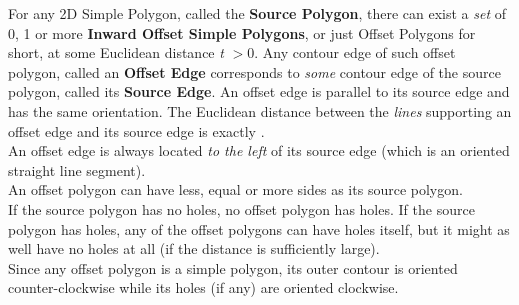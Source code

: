 For any 2D Simple Polygon, called the \textbf{Source Polygon}, there can exist a \textit{set} of 0, 1 or more \textbf{Inward Offset Simple Polygons}, or just Offset Polygons for short, at some Euclidean distance \textit{t} $>0$. Any contour edge of such offset polygon, called an \textbf{Offset Edge} corresponds to \textit{some} contour edge of the source polygon, called its \textbf{Source Edge}. An offset edge is parallel to its source edge and has the same orientation. The Euclidean distance between the \textit{lines} supporting an offset edge and its source edge is exactly .\\
An offset edge is always located \textit{to the left} of its source edge (which is an oriented straight line segment).\\
An offset polygon can have less, equal or more sides as its source polygon.\\
If the source polygon has no holes, no offset polygon has holes. If the source polygon has holes, any of the offset polygons can have holes itself, but it might as well have no holes at all (if the distance is sufficiently large).\\
Since any offset polygon is a simple polygon, its outer contour is oriented counter-clockwise while its holes (if any) are oriented clockwise.


